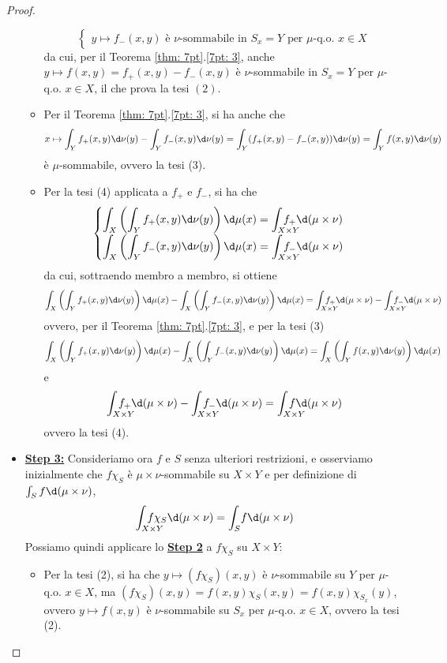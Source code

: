 \begin{proof}
\begin{itemize}
\begin{itemize}
\[\begin{cases}
                y\mapsto f_{-}(x,y) \text{ è $\nu$-sommabile in $S_x=Y$ per $\mu$-q.o. $x\in X$}
            \end{cases}\]
            da cui, per il Teorema \ref{thm: 7pt}.\ref{7pt: 3}, anche $y\mapsto f(x,y)=f_+(x,y)-f_-(x,y)$ è $\nu$-sommabile in $S_x=Y$ per $\mu$-q.o. $x\in X$, il che prova la tesi $(2)$.
            \item Per il Teorema \ref{thm: 7pt}.\ref{7pt: 3}, si ha anche che
            \[x\mapsto \int_Yf_+(x,y)\d\nu(y)-\int_Yf_-(x,y)\d\nu(y) = \int_Y(f_+(x,y)-f_-(x,y))\d\nu(y) = \int_Yf(x,y)\d\nu(y)\]
            è $\mu$-sommabile, ovvero la tesi (3).
            \item Per la tesi (4) applicata a $f_+$ e $f_-$, si ha che 
            \[\begin{cases}
                \displaystyle \int_X\left(\int_Yf_+(x,y)\d\nu(y)\right)\d\mu(x) = \int_{X\times Y}\!\!\!\!\!\!\!\!\!\!f_+\d(\mu\times \nu)\\
                \displaystyle \int_X\left(\int_Yf_-(x,y)\d\nu(y)\right)\d\mu(x) = \int_{X\times Y}\!\!\!\!\!\!\!\!\!\!f_-\d(\mu\times \nu)
            \end{cases}\]
            da cui, sottraendo membro a membro, si ottiene
            \[\int_X\left(\int_Yf_+(x,y)\d\nu(y)\right)\d\mu(x) - \int_X\left(\int_Yf_-(x,y)\d\nu(y)\right)\d\mu(x) = \int_{X\times Y}\!\!\!\!\!\!\!\!\!\!f_+\d(\mu\times \nu) - \int_{X\times Y}\!\!\!\!\!\!\!\!\!\!f_-\d(\mu\times \nu)\]
            ovvero, per il Teorema \ref{thm: 7pt}.\ref{7pt: 3}, e per la tesi (3)
            \[\int_X\left(\int_Yf_+(x,y)\d\nu(y)\right)\d\mu(x) - \int_X\left(\int_Yf_-(x,y)\d\nu(y)\right)\d\mu(x) = \int_X\left(\int_Yf(x,y)\d\nu(y)\right)\d\mu(x)\]
            e
            \[\int_{X\times Y}\!\!\!\!\!\!\!\!\!\!f_+\d(\mu\times \nu) - \int_{X\times Y}\!\!\!\!\!\!\!\!\!\!f_-\d(\mu\times \nu) = \int_{X\times Y}\!\!\!\!\!\!\!\!\!\!f\d(\mu\times \nu)\]
            ovvero la tesi (4).
        \end{itemize}
        \item \textbf{\underline{Step 3:}} Consideriamo ora $f$ e $S$ senza ulteriori restrizioni, e osserviamo inizialmente che $f\chi_S$ è $\mu\times \nu$-sommabile su $X\times Y$ e per definizione di $\int_S f\d(\mu\times\nu)$,
        \[\int_{X\times Y}\!\!\!\!\!\!\!\!\!\!f\chi_S\d(\mu\times \nu) =\int_S\!f\d(\mu\times\nu)\]
        Possiamo quindi applicare lo \textbf{\underline{Step 2}} a $f\chi_S$ su $X\times Y$:
        \begin{itemize}
            \item Per la tesi (2), si ha che $y\mapsto (f\chi_S)(x,y)$ è $\nu$-sommabile su $Y$ per $\mu$-q.o. $x\in X$, ma $(f\chi_S)(x,y) = f(x,y)\chi_S(x,y) = f(x,y)\chi_{S_x}(y)$, ovvero $y\mapsto f(x,y)$ è $\nu$-sommabile su $S_x$ per $\mu$-q.o. $x\in X$, ovvero la tesi (2).

\end{itemize}
\end{itemize}
\end{proof}
